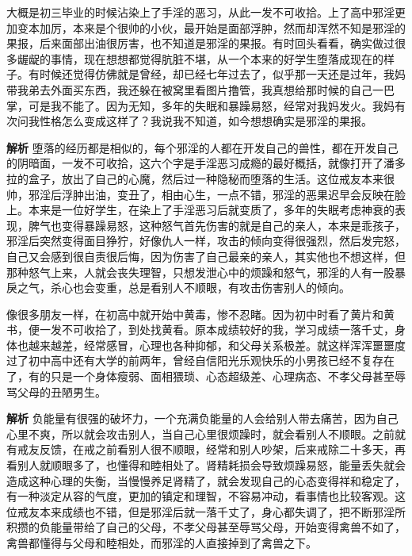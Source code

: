 \begin{case}
    大概是初三毕业的时候沾染上了手淫的恶习，从此一发不可收拾。上了高中邪淫更加变本加厉，本来是个很帅的小伙，最开始是面部浮肿，然而却浑然不知是邪淫的果报，后来面部出油很厉害，也不知道是邪淫的果报。有时回头看看，确实做过很多龌龊的事情，现在想想都觉得肮脏不堪，从一个本来的好学生堕落成现在的样子。有时候还觉得仿佛就是曾经，却已经七年过去了，似乎那一天还是过年，我妈带我弟去外面买东西，我还躲在被窝里看图片撸管，我真想给那时候的自己一巴掌，可是我不能了。因为无知，多年的失眠和暴躁易怒，经常对我妈发火。我妈有次问我性格怎么变成这样了？我说我不知道，如今想想确实是邪淫的果报。

    \textbf{解析} 堕落的经历都是相似的，每个邪淫的人都在开发自己的兽性，都在开发自己的阴暗面，一发不可收拾，这六个字是手淫恶习成瘾的最好概括，就像打开了潘多拉的盒子，放出了自己的心魔，然后过一种隐秘而堕落的生活。这位戒友本来很帅，邪淫后浮肿出油，变丑了，相由心生，一点不错，邪淫的恶果迟早会反映在脸上。本来是一位好学生，在染上了手淫恶习后就变质了，多年的失眠考虑神衰的表现，脾气也变得暴躁易怒，这种怒气首先伤害的就是自己的亲人，本来是乖孩子，邪淫后突然变得面目狰狞，好像仇人一样，攻击的倾向变得很强烈，然后发完怒，自己又会感到很自责很后悔，因为伤害了自己最亲的亲人，其实他也不想这样，但那种怒气上来，人就会丧失理智，只想发泄心中的烦躁和怒气，邪淫的人有一股暴戾之气，杀心也会变重，总是看别人不顺眼，有攻击伤害别人的倾向。
\end{case}

\begin{case}
    像很多朋友一样，在初高中就开始中黄毒，惨不忍睹。因为初中时看了黄片和黄书，便一发不可收拾了，到处找黄看。原本成绩较好的我，学习成绩一落千丈，身体也越来越差，经常感冒，心理也各种抑郁，和父母关系极差。就这样浑浑噩噩度过了初中高中还有大学的前两年，曾经自信阳光乐观快乐的小男孩已经不复存在了，有的只是一个身体瘦弱、面相猥琐、心态超级差、心理病态、不孝父母甚至辱骂父母的丑陋男生。

    \textbf{解析} 负能量有很强的破坏力，一个充满负能量的人会给别人带去痛苦，因为自己心里不爽，所以就会攻击别人，当自己心里很烦躁时，就会看别人不顺眼。之前就有戒友反馈，在戒之前看别人很不顺眼，经常和别人吵架，后来戒除二十多天，再看别人就顺眼多了，也懂得和睦相处了。肾精耗损会导致烦躁易怒，能量丢失就会造成这种心理的失衡，当慢慢养足肾精了，就会发现自己的心态变得祥和稳定了，有一种淡定从容的气度，更加的镇定和理智，不容易冲动，看事情也比较客观。这位戒友本来成绩也不错，但是邪淫后就一落千丈了，身心都失调了，把不断邪淫所积攒的负能量带给了自己的父母，不孝父母甚至辱骂父母，开始变得禽兽不如了，禽兽都懂得与父母和睦相处，而邪淫的人直接掉到了禽兽之下。
\end{case}

